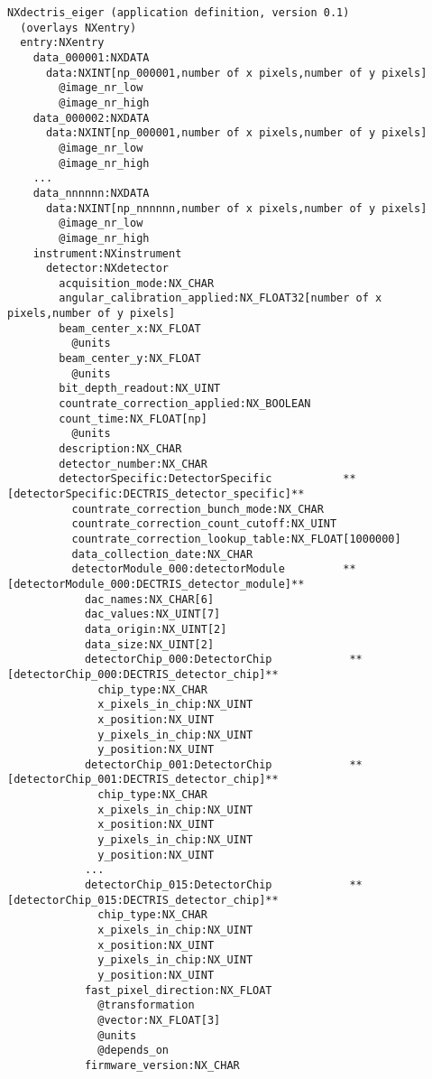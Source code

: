 \documentclass[11pt]{article}
\begin{document}
{{\footnotesize{\begin{verbatim}
NXdectris_eiger (application definition, version 0.1)
  (overlays NXentry)
  entry:NXentry
    data_000001:NXDATA
      data:NXINT[np_000001,number of x pixels,number of y pixels]
        @image_nr_low
        @image_nr_high
    data_000002:NXDATA
      data:NXINT[np_000001,number of x pixels,number of y pixels]
        @image_nr_low
        @image_nr_high
    ...
    data_nnnnnn:NXDATA
      data:NXINT[np_nnnnnn,number of x pixels,number of y pixels]
        @image_nr_low
        @image_nr_high
    instrument:NXinstrument
      detector:NXdetector
        acquisition_mode:NX_CHAR
        angular_calibration_applied:NX_FLOAT32[number of x pixels,number of y pixels]
        beam_center_x:NX_FLOAT
          @units
        beam_center_y:NX_FLOAT
          @units
        bit_depth_readout:NX_UINT
        countrate_correction_applied:NX_BOOLEAN
        count_time:NX_FLOAT[np]
          @units
        description:NX_CHAR
        detector_number:NX_CHAR
        detectorSpecific:DetectorSpecific           **[detectorSpecific:DECTRIS_detector_specific]**
          countrate_correction_bunch_mode:NX_CHAR
          countrate_correction_count_cutoff:NX_UINT
          countrate_correction_lookup_table:NX_FLOAT[1000000]
          data_collection_date:NX_CHAR
          detectorModule_000:detectorModule         **[detectorModule_000:DECTRIS_detector_module]**
            dac_names:NX_CHAR[6]
            dac_values:NX_UINT[7]
            data_origin:NX_UINT[2]
            data_size:NX_UINT[2]
            detectorChip_000:DetectorChip            **[detectorChip_000:DECTRIS_detector_chip]**
              chip_type:NX_CHAR
              x_pixels_in_chip:NX_UINT
              x_position:NX_UINT
              y_pixels_in_chip:NX_UINT
              y_position:NX_UINT
            detectorChip_001:DetectorChip            **[detectorChip_001:DECTRIS_detector_chip]**
              chip_type:NX_CHAR
              x_pixels_in_chip:NX_UINT
              x_position:NX_UINT
              y_pixels_in_chip:NX_UINT
              y_position:NX_UINT
            ...  
            detectorChip_015:DetectorChip            **[detectorChip_015:DECTRIS_detector_chip]**
              chip_type:NX_CHAR
              x_pixels_in_chip:NX_UINT
              x_position:NX_UINT
              y_pixels_in_chip:NX_UINT
              y_position:NX_UINT
            fast_pixel_direction:NX_FLOAT
              @transformation
              @vector:NX_FLOAT[3]
              @units
              @depends_on
            firmware_version:NX_CHAR

\end{verbatim}}}}
\end{document}
